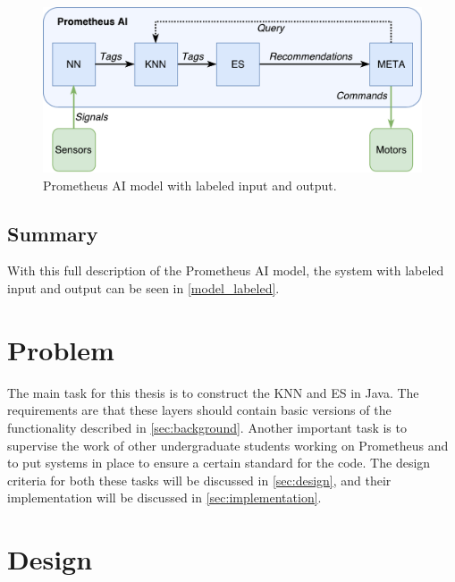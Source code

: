 \documentclass[titlepage,11pt]{article}
\begin{document}
\begin{figure}[!htb]
	\includegraphics[width=\textwidth]{figures/ai_model_labeled.pdf}
	\caption{Prometheus AI model with labeled input and output.}
	\label{model_labeled}
\end{figure}

\subsection{Summary}

With this full description of the Prometheus AI model, the system with labeled input and output can be seen in \autoref{model_labeled}.

\section{Problem}
\label{sec:problem}

The main task for this thesis is to construct the KNN and ES in Java. The requirements are that these layers should contain basic versions of the functionality described in \autoref{sec:background}. Another important task is to supervise the work of other undergraduate students working on Prometheus and to put systems in place to ensure a certain standard for the code. The design criteria for both these tasks will be discussed in \autoref{sec:design}, and their implementation will be discussed in \cref{sec:implementation}.

\section{Design}
\label{sec:design}
\end{document}
